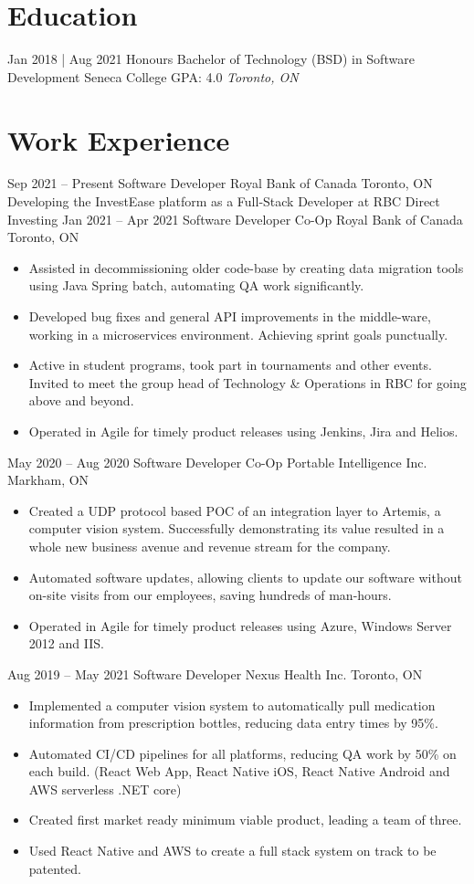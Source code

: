 \documentclass[letterpaper]{moderncv}
\begin{document}
\makecvtitle
    

\section{Education}
\cventry
{Jan 2018 | Aug 2021}
{Honours Bachelor of Technology (BSD) in Software Development}
{Seneca College}
{GPA: 4.0}
{\textit{Toronto, ON}}
{}
\section{Work Experience}
\cventry
{Sep 2021 -- Present}
{Software Developer}
{Royal Bank of Canada}
{Toronto, ON}
{}
{Developing the InvestEase platform as a Full-Stack Developer at RBC Direct Investing}
\cventry
{Jan 2021 -- Apr 2021}
{Software Developer Co-Op}
{Royal Bank of Canada}
{Toronto, ON}
{}
{\begin{itemize}%
	\item Assisted in decommissioning older code-base by creating data migration tools using Java Spring batch, automating QA work significantly.
	\item Developed bug fixes and general API improvements in the middle-ware, working in a microservices environment. Achieving sprint goals punctually.
	\item Active in student programs, took part in tournaments and other events. Invited to meet the group head of Technology \& Operations in RBC for going above and beyond.
	\item Operated in Agile for timely product releases using Jenkins, Jira and Helios.
	\end{itemize}}
\cventry
{May 2020 -- Aug 2020}
{Software Developer Co-Op}
{Portable Intelligence Inc.}
{Markham, ON}
{}
{\begin{itemize}%
	\item Created a UDP protocol based POC of an integration layer to Artemis, a computer vision system. Successfully demonstrating its value resulted in a whole new business avenue and revenue stream for the company.
	\item Automated software updates, allowing clients to update our software without on-site visits from our employees, saving hundreds of man-hours.
	\item Operated in Agile for timely product releases using Azure, Windows Server 2012 and IIS.
	\end{itemize}}
\cventry
{Aug 2019 -- May 2021}
{Software Developer}
{Nexus Health Inc.}
{Toronto, ON}
{}
{\begin{itemize}%
    \item Implemented a computer vision system to automatically pull medication information from prescription bottles, reducing data entry times by 95\%.
    \item Automated CI/CD pipelines for all platforms, reducing QA work by 50\% on each build. (React Web App, React Native iOS, React Native Android and AWS serverless .NET core)
	\item Created first market ready minimum viable product, leading a team of three.
	\item Used React Native and AWS to create a full stack system on track to be patented.
	\end{itemize}}
\end{document}
